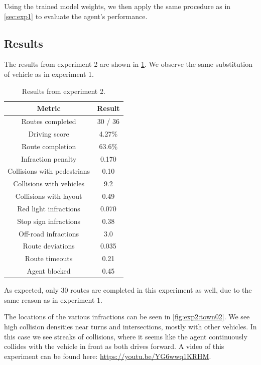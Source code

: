 Using the trained model weights,
we then apply the same procedure as in \cref{sec:exp1}
to evaluate the agent's performance.


\subsection{Results}

The results from experiment 2 are shown in \cref{tab:exp2:results}.
We observe the same substitution of vehicle as in experiment 1.

\begin{table}[]
    \centering
    \begin{tabular}{|c|c|}
        \hline
        \textbf{Metric} & \textbf{Result} \\ \hline
        Routes completed & 30 / 36 \\ \hline
        Driving score & 4.27\% \\ \hline
        Route completion & 63.6\% \\ \hline
        Infraction penalty & 0.170 \\ \hline
        Collisions with pedestrians & 0.10 \\ \hline
        Collisions with vehicles & 9.2 \\ \hline
        Collisions with layout & 0.49 \\ \hline
        Red light infractions & 0.070 \\ \hline
        Stop sign infractions & 0.38 \\ \hline
        Off-road infractions & 3.0 \\ \hline
        Route deviations & 0.035 \\ \hline
        Route timeouts & 0.21 \\ \hline
        Agent blocked & 0.45 \\ \hline
    \end{tabular}
    \caption{Results from experiment 2.}
    \label{tab:exp2:results}
\end{table}

As expected, only 30 routes are completed in this experiment as well, due to the same reason as in experiment 1.

The locations of the various infractions can be seen in \cref{fig:exp2:town02}.
We see high collision densities near turns and intersections,
mostly with other vehicles.
In this case we see streaks of collisions,
where it seems like the agent continuously collides
with the vehicle in front as both drives forward. 
A video of this experiment can be found here: \url{https://youtu.be/YG6wwq1KRHM}.

